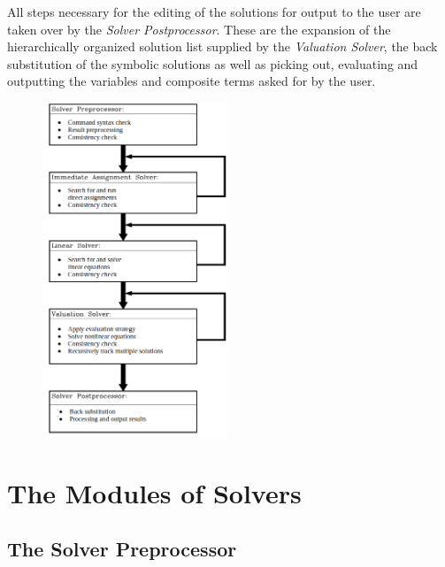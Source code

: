 All steps necessary for the editing of the solutions for output to the user are taken over  by the {\em Solver Postprocessor}. These are the expansion of the hierarchically organized solution list supplied by the {\em Valuation  Solver}, the back substitution of the
symbolic solutions as well as picking out, evaluating and outputting the variables and composite terms asked for by the user.

\begin {figure} [htbp]
\begin {center}
\includegraphics[height=10cm]{StrukturEn.png}
\caption {}
\end {center}
\end {figure}

\clearpage

\section{The Modules of Solvers}

\subsection{The Solver Preprocessor}

